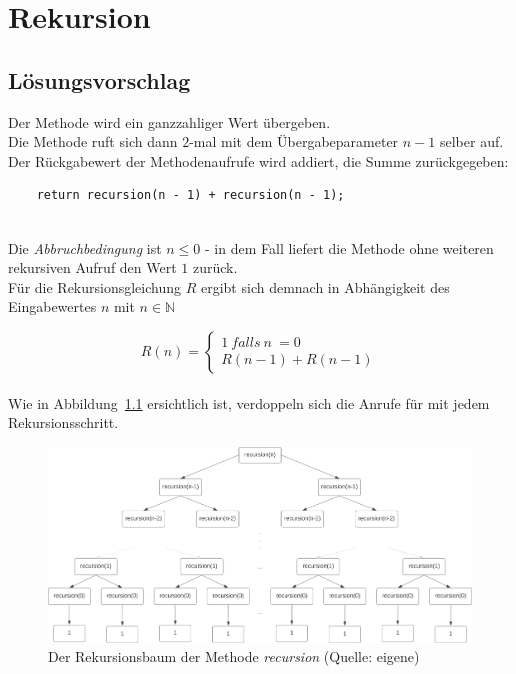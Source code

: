 \chapter{Rekursion}

\section{Lösungsvorschlag}

Der Methode  wird ein ganzzahliger Wert übergeben.\\
Die Methode ruft sich dann $2$-mal mit dem Übergabeparameter $n - 1$ selber auf.\\
Der Rückgabewert der Methodenaufrufe wird addiert, die Summe zurückgegeben:

\begin{verbatim}
    return recursion(n - 1) + recursion(n - 1);
\end{verbatim}\\

\noindent
Die \textit{Abbruchbedingung} ist $n \leq 0$ - in dem Fall liefert die Methode ohne weiteren rekursiven Aufruf den Wert $1$ zurück.\\


\noindent
Für die Rekursionsgleichung $R$ ergibt sich demnach in Abhängigkeit des Eingabewertes $n$ mit $n \in \mathbb{N}$

\begin{equation}
    R(n) = \begin{cases}
               1\ falls\ n\ = 0 \\
               R(n-1) + R(n-1)
    \end{cases}
\end{equation}\\

\noindent
Wie in Abbildung~\ref{fig:recursion} ersichtlich ist, verdoppeln sich die Anrufe für  mit jedem Rekursionsschritt.\\

\begin{figure}
    \begin{center}
        \includegraphics[scale=0.3]{chapters/9. Rekursion/img/recursion}
        \caption{Der Rekursionsbaum der Methode \textit{recursion} (Quelle: eigene)}
        \label{fig:recursion}
    \end{center}
\end{figure}


